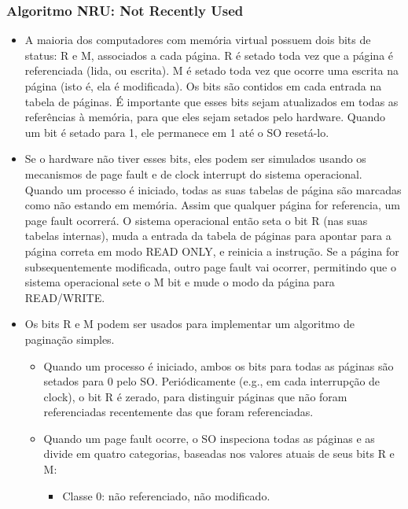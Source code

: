 \documentclass[10pt]{article}
\begin{document}
\subsubsection{Algoritmo NRU: Not Recently Used}
\begin{itemize}
    \item A maioria dos computadores com memória virtual possuem dois bits de status:
        R e M, associados a cada página. R é setado toda vez que a página é referenciada
        (lida, ou escrita). M é setado toda vez que ocorre uma escrita na página (isto é,
        ela é modificada). Os bits são contidos em cada entrada na tabela de páginas. É 
        importante que esses bits sejam atualizados em todas as referências à memória, 
        para que eles sejam setados pelo hardware. Quando um bit é setado para 1, ele
        permanece em 1 até o SO resetá-lo.
    \item Se o hardware não tiver esses bits, eles podem ser simulados usando os mecanismos
        de page fault e de clock interrupt do sistema operacional. Quando um processo é 
        iniciado, todas as suas tabelas de página são marcadas como não estando em memória.
        Assim que qualquer página for referencia, um page fault ocorrerá. O sistema operacional
        então seta o bit R (nas suas tabelas internas), muda a entrada da tabela de páginas para
        apontar para a página correta em modo READ ONLY, e reinicia a instrução. Se a página for
        subsequentemente modificada, outro page fault vai ocorrer, permitindo que o sistema operacional
        sete o M bit e mude o modo da página para READ/WRITE.
    \item Os bits R e M podem ser usados para implementar um algoritmo de paginação simples.
        \begin{itemize}
            \item Quando um processo é iniciado, ambos os bits para todas as páginas são setados
                para 0 pelo SO. Periódicamente (e.g., em cada interrupção de clock), o bit R
                é zerado, para distinguir páginas que não foram referenciadas recentemente das
                que foram referenciadas. 
            \item Quando um page fault ocorre, o SO inspeciona todas as páginas e as divide
                em quatro categorias, baseadas nos valores atuais de seus bits R e M:
                \begin{itemize}
                    \item Classe 0: não referenciado, não modificado.

\end{itemize}
\end{itemize}
\end{itemize}
\end{document}
